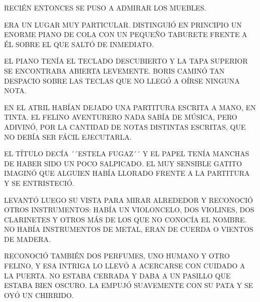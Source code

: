 \newpage
{}
RECIÉN ENTONCES SE PUSO A ADMIRAR LOS MUEBLES. 
\begin{flushright}
	\begin{minipage}[r]{.86\textwidth}
		ERA UN LUGAR MUY PARTICULAR. DISTINGUIÓ EN PRINCIPIO UN ENORME PIANO DE COLA CON UN PEQUEÑO TABURETE FRENTE A ÉL SOBRE EL QUE SALTÓ DE INMEDIATO.
		
	\end{minipage}
\end{flushright} 
EL PIANO TENÍA EL TECLADO DESCUBIERTO Y LA TAPA SUPERIOR SE
ENCONTRABA ABIERTA LEVEMENTE. BORIS CAMINÓ TAN DESPACIO SOBRE LAS TECLAS QUE NO LLEGÓ A OÍRSE NINGUNA NOTA. 

EN EL ATRIL HABÍAN DEJADO UNA PARTITURA ESCRITA A MANO, EN TINTA. EL FELINO AVENTURERO NADA SABÍA DE MÚSICA, PERO ADIVINÓ, POR LA CANTIDAD DE NOTAS DISTINTAS ESCRITAS, QUE NO DEBÍA SER FÁCIL EJECUTARLA. 

EL TÍTULO DECÍA ´´ESTELA FUGAZ´´ Y EL PAPEL TENÍA MANCHAS DE HABER SIDO UN POCO SALPICADO. EL MUY SENSIBLE GATITO IMAGINÓ QUE ALGUIEN HABÍA LLORADO FRENTE A LA PARTITURA Y SE ENTRISTECIÓ.


\newpage
{}
LEVANTÓ LUEGO SU VISTA PARA MIRAR ALREDEDOR Y RECONOCIÓ OTROS INSTRUMENTOS: HABÍA UN VIOLONCELO, DOS VIOLINES, DOS CLARINETES Y OTROS MÁS DE LOS QUE NO CONOCÍA EL NOMBRE. NO HABÍA INSTRUMENTOS DE METAL, ERAN DE CUERDA O VIENTOS DE MADERA. 

RECONOCIÓ TAMBIÉN DOS PERFUMES, UNO HUMANO Y OTRO FELINO, Y ESA INTRIGA LO LLEVÓ A ACERCARSE CON CUIDADO A LA PUERTA. NO ESTABA CERRADA Y DABA A UN PASILLO QUE ESTABA BIEN OSCURO. LA EMPUJÓ SUAVEMENTE CON SU PATA Y SE OYÓ UN CHIRRIDO.

